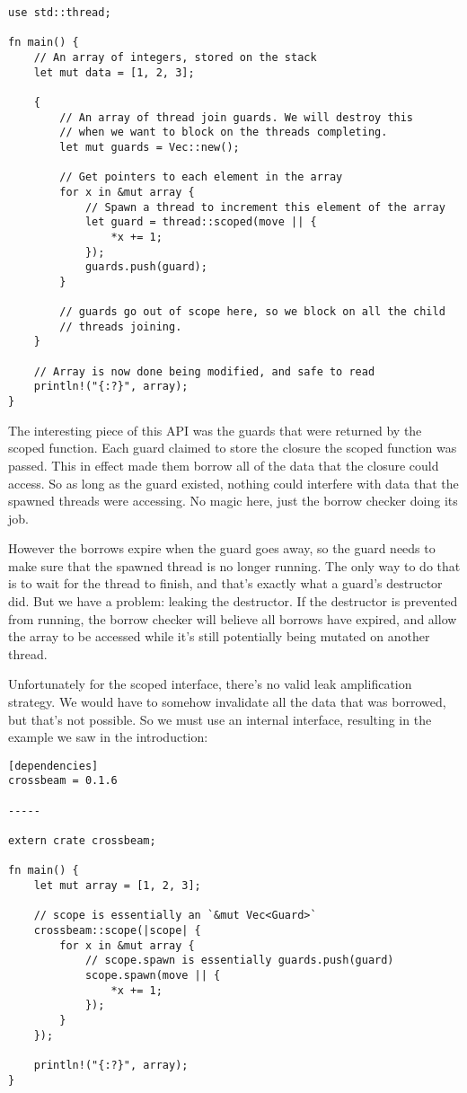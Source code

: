 \begin{verbatim}
use std::thread;

fn main() {
    // An array of integers, stored on the stack
    let mut data = [1, 2, 3];

    {
        // An array of thread join guards. We will destroy this
        // when we want to block on the threads completing.
        let mut guards = Vec::new();

        // Get pointers to each element in the array
        for x in &mut array {
            // Spawn a thread to increment this element of the array
            let guard = thread::scoped(move || {
                *x += 1;
            });
            guards.push(guard);
        }

        // guards go out of scope here, so we block on all the child
        // threads joining.
    }

    // Array is now done being modified, and safe to read
    println!("{:?}", array);
}
\end{verbatim}

The interesting piece of this API was the guards that were returned
by the scoped function. Each guard claimed to store the closure the
scoped function was passed. This in effect made them borrow all of the
data that the closure could access. So as long as the guard existed, nothing
could interfere with data that the spawned threads were accessing. No magic
here, just the borrow checker doing its job.

However the borrows expire when the guard goes away, so the guard needs to
make sure that the spawned thread is no longer running. The only way to do
that is to wait for the thread to finish, and that's exactly what a guard's
destructor did. But we have a problem: leaking the destructor. If the destructor
is prevented from running, the borrow checker will believe all borrows have
expired, and allow the array to be accessed while it's still potentially
being mutated on another thread.

Unfortunately for the scoped interface, there's no valid leak amplification strategy.
We would have to somehow invalidate all the data that was borrowed, but that's
not possible. So we must use an internal interface, resulting in the example
we saw in the introduction:

\begin{verbatim}
[dependencies]
crossbeam = 0.1.6

-----

extern crate crossbeam;

fn main() {
    let mut array = [1, 2, 3];

    // scope is essentially an `&mut Vec<Guard>`
    crossbeam::scope(|scope| {
        for x in &mut array {
            // scope.spawn is essentially guards.push(guard)
            scope.spawn(move || {
                *x += 1;
            });
        }
    });

    println!("{:?}", array);
}
\end{verbatim}


